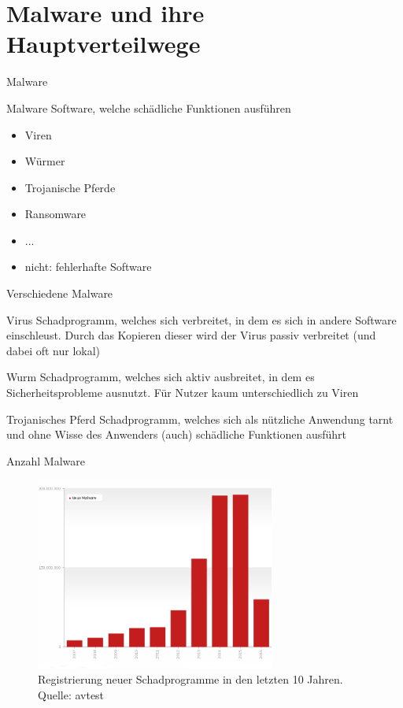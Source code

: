 \documentclass{beamer}
\begin{document}
	\section{Malware und ihre Hauptverteilwege}
	
	\begin{frame}{Malware}
		\begin{alertblock}{Malware}
			Software, welche schädliche Funktionen ausführen
		\end{alertblock}
		
		\begin{itemize}
			\item Viren
			\item Würmer
			\item Trojanische Pferde
			\item Ransomware 
			\item ...
			\item \alert{nicht:} fehlerhafte Software
		\end{itemize}
	\end{frame}
	
	\begin{frame}{Verschiedene Malware}
		\begin{alertblock}{Virus}
			Schadprogramm, welches sich verbreitet, in dem es sich in andere Software einschleust. Durch das Kopieren dieser wird der Virus passiv verbreitet (und dabei oft nur lokal)
		\end{alertblock}
		\begin{alertblock}{Wurm}
			Schadprogramm, welches sich aktiv ausbreitet, in dem es Sicherheitsprobleme ausnutzt. Für Nutzer kaum unterschiedlich zu Viren
		\end{alertblock}
		\begin{alertblock}{Trojanisches Pferd}
			Schadprogramm, welches sich als nützliche Anwendung tarnt und ohne Wisse des Anwenders (auch) schädliche Funktionen ausführt
		\end{alertblock}
	\end{frame}
	
	\begin{frame}{Anzahl Malware}
		\begin{figure}
			\centering
			\includegraphics[width=0.7\textwidth]{Bilder/new_malware_transparent.png}
			\caption{Registrierung neuer Schadprogramme in den letzten 10 Jahren. Quelle: avtest}
		\end{figure}		
	\end{frame}
	
\end{document}

